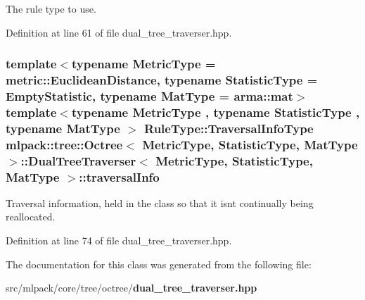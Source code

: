 The rule type to use. 



Definition at line 61 of file dual\+\_\+tree\+\_\+traverser.\+hpp.

\subsubsection[{traversal\+Info}]{\setlength{\rightskip}{0pt plus 5cm}template$<$typename Metric\+Type  = metric\+::\+Euclidean\+Distance, typename Statistic\+Type  = Empty\+Statistic, typename Mat\+Type  = arma\+::mat$>$ template$<$typename Metric\+Type , typename Statistic\+Type , typename Mat\+Type $>$ Rule\+Type\+::\+Traversal\+Info\+Type {\bf mlpack\+::tree\+::\+Octree}$<$ Metric\+Type, Statistic\+Type, Mat\+Type $>$\+::{\bf Dual\+Tree\+Traverser}$<$ Metric\+Type, Statistic\+Type, Mat\+Type $>$\+::traversal\+Info\hspace{0.3cm}{\ttfamily [private]}}\label{classmlpack_1_1tree_1_1Octree_1_1DualTreeTraverser_af549771f12ff31e4ec6e8f073cb5fc44}


Traversal information, held in the class so that it isn\textquotesingle{}t continually being reallocated. 



Definition at line 74 of file dual\+\_\+tree\+\_\+traverser.\+hpp.



The documentation for this class was generated from the following file\+:\begin{DoxyCompactItemize}
\item 
src/mlpack/core/tree/octree/{\bf dual\+\_\+tree\+\_\+traverser.\+hpp}\end{DoxyCompactItemize}
